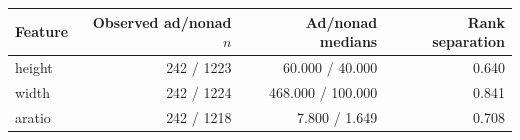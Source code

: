 \begin{tabular}{lrrr}\toprule
Feature & Observed ad/nonad $n$ & Ad/nonad medians & Rank separation\\\midrule
height & 242 / 1223 & 60.000 / 40.000 & 0.640\\
width & 242 / 1224 & 468.000 / 100.000 & 0.841\\
aratio & 242 / 1218 & 7.800 / 1.649 & 0.708\\
\bottomrule\end{tabular}
